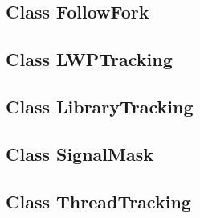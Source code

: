 \documentclass{article}
\begin{document}
  \subsection{Class FollowFork}
    

  \subsection{Class LWPTracking}
    

  \subsection{Class LibraryTracking}
    

  \subsection{Class SignalMask}
    

  \subsection{Class ThreadTracking}
    
\end{document}
